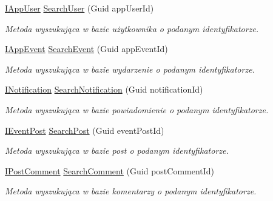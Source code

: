 \begin{DoxyCompactItemize}
\item 
\hyperlink{interface_contract_1_1_i_app_user}{I\+App\+User} \hyperlink{class_bibabook_1_1_implementation_1_1_search_service_1_1_search_helpers_1_1_search_helper_a8b39cc678b93c48100fb0f8be980cc5c}{Search\+User} (Guid app\+User\+Id)
\begin{DoxyCompactList}\small\item\em Metoda wyszukująca w bazie użytkownika o podanym identyfikatorze. \end{DoxyCompactList}\item 
\hyperlink{interface_contract_1_1_i_app_event}{I\+App\+Event} \hyperlink{class_bibabook_1_1_implementation_1_1_search_service_1_1_search_helpers_1_1_search_helper_a1bb87e7993fbb6f80a635e8c6607eb7f}{Search\+Event} (Guid app\+Event\+Id)
\begin{DoxyCompactList}\small\item\em Metoda wyszukująca w bazie wydarzenie o podanym identyfikatorze. \end{DoxyCompactList}\item 
\hyperlink{interface_contract_1_1_i_notification}{I\+Notification} \hyperlink{class_bibabook_1_1_implementation_1_1_search_service_1_1_search_helpers_1_1_search_helper_a24f1ae5080c207f8ce519d196e849acd}{Search\+Notification} (Guid notification\+Id)
\begin{DoxyCompactList}\small\item\em Metoda wyszukująca w bazie powiadomienie o podanym identyfikatorze. \end{DoxyCompactList}\item 
\hyperlink{interface_contract_1_1_i_event_post}{I\+Event\+Post} \hyperlink{class_bibabook_1_1_implementation_1_1_search_service_1_1_search_helpers_1_1_search_helper_a413a28aa268b6953571fc9c9849a731f}{Search\+Post} (Guid event\+Post\+Id)
\begin{DoxyCompactList}\small\item\em Metoda wyszukująca w bazie post o podanym identyfikatorze. \end{DoxyCompactList}\item 
\hyperlink{interface_contract_1_1_i_post_comment}{I\+Post\+Comment} \hyperlink{class_bibabook_1_1_implementation_1_1_search_service_1_1_search_helpers_1_1_search_helper_a2935e38b59d91cb767a2b1ba3de91d75}{Search\+Comment} (Guid post\+Comment\+Id)
\begin{DoxyCompactList}\small\item\em Metoda wyszukująca w bazie komentarzy o podanym identyfikatorze. \end{DoxyCompactList}\end{DoxyCompactItemize}



